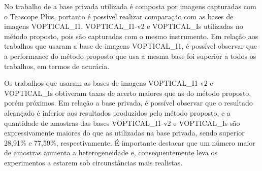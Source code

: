 No trabalho de  a base privada utilizada é composta por imagens capturadas com o Teascope Plus, portanto é possível realizar comparação com as bases de imagens VOPTICAL\_I1, VOPTICAL\_I1-v2 e VOPTICAL\_Is utilizadas no método proposto, pois são capturadas com o mesmo instrumento. Em relação aos trabalhos que usaram a base de imagens VOPTICAL\_I1, é possível observar que a performance do método proposto que usa a mesma base foi superior a todos os trabalhos, em termos de acurácia.


Os trabalhos que usaram as bases de imagens VOPTICAL\_I1-v2 e VOPTICAL\_Is obtiveram taxas de acerto maiores que as do método proposto, porém próximos. Em relação a base privada, é possível observar que o resultado alcançado é inferior aos resultados produzidos pelo método proposto, e a quantidade de amostras das bases VOPTICAL\_I1-v2 e VOPTICAL\_Is são expressivamente maiores do que as utilizadas na base privada, sendo superior 28,91\% e 77,59\%, respectivamente. É importante destacar que um número maior de amostras aumenta a heterogeneidade e, consequentemente leva os experimentos a estarem sob circunstâncias mais realistas.

